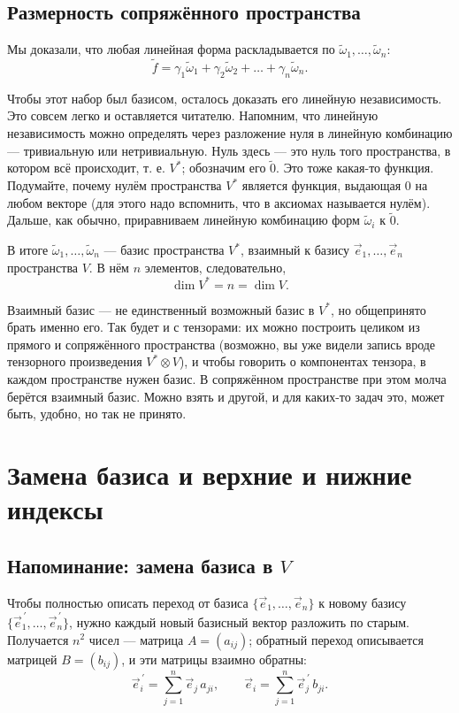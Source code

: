 \documentclass[11pt,a4paper]{article}
\begin{document}
\subsection{Размерность сопряжённого пространства}

Мы доказали, что любая линейная форма раскладывается по $\tilde\omega_1, \dots, \tilde\omega_n$:
\[
\tilde f = \gamma_1 \tilde\omega_1 + \gamma_2 \tilde\omega_2 + \dots + \gamma_n \tilde\omega_n.
\]

Чтобы этот набор был базисом, осталось доказать его линейную независимость. Это совсем легко и оставляется читателю. Напомним, что линейную независимость можно определять через разложение нуля в линейную комбинацию — тривиальную или нетривиальную. Нуль здесь — это нуль того пространства, в котором всё происходит, т. е. $V^*$; обозначим его $\tilde 0$. Это тоже какая-то функция. Подумайте, почему нулём пространства $V^*$ является функция, выдающая $0$ на любом векторе (для этого надо вспомнить, что в аксиомах называется нулём). Дальше, как обычно, приравниваем линейную комбинацию форм $\tilde\omega_i$ к $\tilde 0$.

В итоге $\tilde\omega_1, \dots, \tilde\omega_n$ — базис пространства $V^*$, взаимный к базису $\vec e_1, \dots, \vec e_n$ пространства $V$. В нём $n$ элементов, следовательно,
\[
\dim V^* = n = \dim V.
\]

Взаимный базис — не единственный возможный базис в $V^*$, но общепринято брать именно его. Так будет и с тензорами: их можно построить целиком из прямого и сопряжённого пространства (возможно, вы уже видели запись вроде тензорного произведения $V^* \otimes V$), и чтобы говорить о компонентах тензора, в каждом пространстве нужен базис. В сопряжённом пространстве при этом молча берётся взаимный базис. Можно взять и другой, и для каких-то задач это, может быть, удобно, но так не принято.

\section{Замена базиса и верхние и нижние индексы}

\subsection{Напоминание: замена базиса в $V$}

Чтобы полностью описать переход от базиса $\{\vec e_1, \dots, \vec e_n\}$ к новому базису $\{\vec e^{\,\prime}_1, \dots, \vec e^{\,\prime}_n\}$, нужно каждый новый базисный вектор разложить по старым. Получается $n^2$ чисел — матрица $A = (a_{ij})$; обратный переход описывается матрицей $B = (b_{ij})$, и эти матрицы взаимно обратны:
\[
\vec e^{\,\prime}_i = \sum_{j=1}^n \vec e_j\, a_{ji}, \qquad \vec e_i = \sum_{j=1}^n \vec e^{\,\prime}_j\, b_{ji}.
\]
\end{document}
